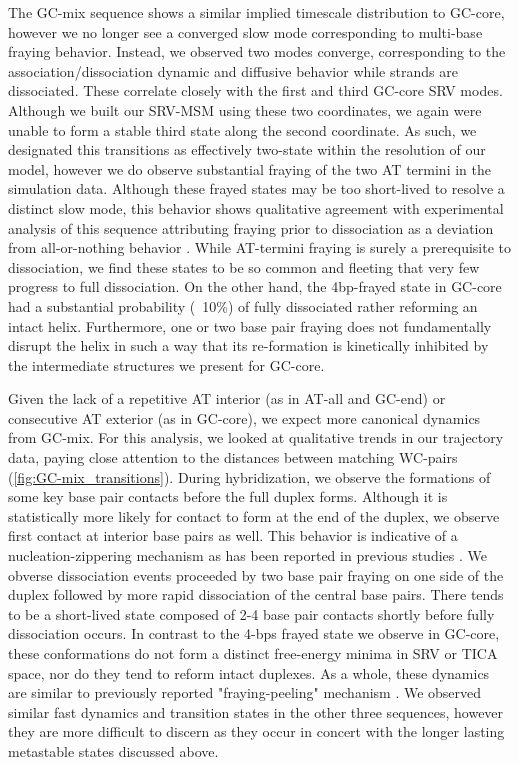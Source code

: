 \documentclass[journal=jpcbfk,manuscript=article]{achemso}
\begin{document}
The GC-mix sequence shows a similar implied timescale distribution to GC-core, however we no longer see a converged slow mode corresponding to multi-base fraying behavior. Instead, we observed two modes converge, corresponding to the association/dissociation dynamic and diffusive behavior while strands are dissociated. These correlate closely with the first and third GC-core SRV modes. Although we built our SRV-MSM using these two coordinates, we again were unable to form a stable third state along the second coordinate. As such, we designated this transitions as effectively two-state within the resolution of our model, however we do observe substantial fraying of the two AT termini in the simulation data. Although these frayed states may be too short-lived to resolve a distinct slow mode, this behavior shows qualitative agreement with experimental analysis of this sequence attributing fraying prior to dissociation as a deviation from all-or-nothing behavior \citep{Sanstead2016}.  While AT-termini fraying is surely a prerequisite to dissociation, we find these states to be so common and fleeting that very few progress to full dissociation. On the other hand, the 4bp-frayed state in GC-core had a substantial probability (~10\%) of fully dissociated rather reforming an intact helix. Furthermore, one or two base pair fraying does not fundamentally disrupt the helix in such a way that its re-formation is kinetically inhibited by the intermediate structures we present for GC-core.  

Given the lack of a repetitive AT interior (as in AT-all and GC-end) or consecutive AT exterior (as in GC-core), we expect more canonical dynamics from GC-mix. For this analysis, we looked at qualitative trends in our trajectory data, paying close attention to the distances between matching WC-pairs (\ref{fig:GC-mix_transitions}). During hybridization, we observe the formations of some key base pair contacts before the full duplex forms. Although it is statistically more likely for contact to form at the end of the duplex, we observe first contact at interior base pairs as well. This behavior is indicative of a nucleation-zippering mechanism as has been reported in previous studies \citep{Yin2011KineticsHybridization, Porschke1971CooperativeTransition}. We obverse dissociation events proceeded by two base pair fraying on one side of the duplex followed by more rapid dissociation of the central base pairs. There tends to be a short-lived state composed of 2-4 base pair contacts shortly before fully dissociation occurs. In contrast to the 4-bps frayed state we observe in GC-core, these conformations do not form a distinct free-energy minima in SRV or TICA space, nor do they tend to reform intact duplexes. As a whole, these dynamics are similar to previously reported "fraying-peeling" mechanism \citep{Wong2008TheSimulations, Perez2010Real-timeUnfolding, Zgarbova2014BaseRNA}. We observed similar fast dynamics and transition states in the other three sequences, however they are more difficult to discern as they occur in concert with the longer lasting metastable states discussed above.
\end{document}
